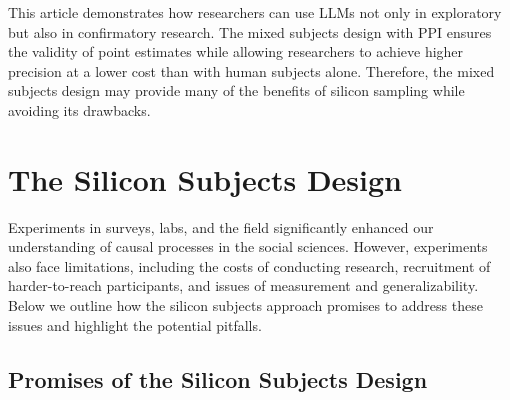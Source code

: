 \documentclass{article}
\begin{document}
This article demonstrates how researchers can use LLMs not only in exploratory but also in confirmatory research. The mixed subjects design with PPI ensures the validity of point estimates while allowing researchers to achieve higher precision at a lower cost than with human subjects alone. Therefore, the mixed subjects design may provide many of the benefits of silicon sampling while avoiding its drawbacks. 


\section{The Silicon Subjects Design}

Experiments in surveys, labs, and the field significantly enhanced our understanding of causal processes in the social sciences. However, experiments also face limitations, including the costs of conducting research, recruitment of harder-to-reach participants, and issues of measurement and generalizability. Below we outline how the silicon subjects approach promises to address these issues and highlight the potential pitfalls. 

\subsection{Promises of the Silicon Subjects Design}\label{sec:promises-silicon}
\end{document}
